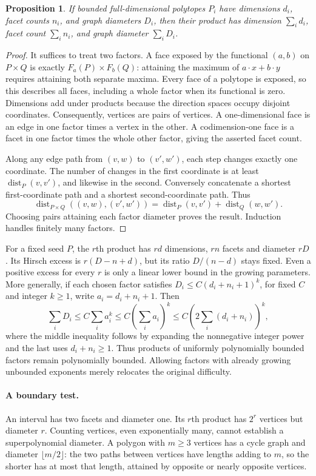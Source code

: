 \documentclass[11pt]{article}
\newtheorem{proposition}{Proposition}
\begin{document}
\begin{proposition}
If bounded full-dimensional polytopes $P_i$ have dimensions $d_i$, facet counts $n_i$, and graph diameters $D_i$, then their product has dimension $\sum_i d_i$, facet count $\sum_i n_i$, and graph diameter $\sum_i D_i$.
\end{proposition}
\begin{proof}
It suffices to treat two factors. A face exposed by the functional $(a,b)$ on $P\times Q$ is exactly $F_a(P)\times F_b(Q)$: attaining the maximum of $a\cdot x+b\cdot y$ requires attaining both separate maxima. Every face of a polytope is exposed, so this describes all faces, including a whole factor when its functional is zero. Dimensions add under products because the direction spaces occupy disjoint coordinates. Consequently, vertices are pairs of vertices. A one-dimensional face is an edge in one factor times a vertex in the other. A codimension-one face is a facet in one factor times the whole other factor, giving the asserted facet count.

Along any edge path from $(v,w)$ to $(v',w')$, each step changes exactly one coordinate. The number of changes in the first coordinate is at least $\operatorname{dist}_P(v,v')$, and likewise in the second. Conversely concatenate a shortest first-coordinate path and a shortest second-coordinate path. Thus
\[
 \operatorname{dist}_{P\times Q}((v,w),(v',w'))
 =\operatorname{dist}_P(v,v')+\operatorname{dist}_Q(w,w').
\]
Choosing pairs attaining each factor diameter proves the result. Induction handles finitely many factors.
\end{proof}

For a fixed seed $P$, the $r$th product has $rd$ dimensions, $rn$ facets and diameter $rD$. Its Hirsch excess is $r(D-n+d)$, but its ratio $D/(n-d)$ stays fixed. Even a positive excess for every $r$ is only a linear lower bound in the growing parameters. More generally, if each chosen factor satisfies $D_i\le C(d_i+n_i+1)^k$, for fixed $C$ and integer $k\ge1$, write $a_i=d_i+n_i+1$. Then
\[
 \sum_iD_i\le C\sum_i a_i^k\le C(\sum_i a_i)^k
 \le C(2\sum_i(d_i+n_i))^k,
\]
where the middle inequality follows by expanding the nonnegative integer power and the last uses $d_i+n_i\ge1$. Thus products of uniformly polynomially bounded factors remain polynomially bounded. Allowing factors with already growing unbounded exponents merely relocates the original difficulty.

\paragraph{A boundary test.}
An interval has two facets and diameter one. Its $r$th product has $2^r$ vertices but diameter $r$. Counting vertices, even exponentially many, cannot establish a superpolynomial diameter. A polygon with $m\ge3$ vertices has a cycle graph and diameter $\lfloor m/2\rfloor$: the two paths between vertices have lengths adding to $m$, so the shorter has at most that length, attained by opposite or nearly opposite vertices.
\end{document}
